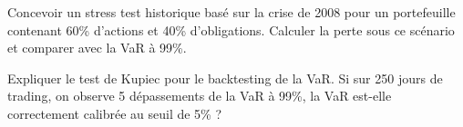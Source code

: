 \begin{exercice}
Concevoir un stress test historique bas\'e sur la crise de 2008 pour un
portefeuille contenant 60\% d'actions et 40\% d'obligations. Calculer la
perte sous ce sc\'enario et comparer avec la VaR \`a 99\%.
\end{exercice}

\begin{exercice}[Backtesting]
Expliquer le test de Kupiec pour le backtesting de la VaR. Si sur 250 jours
de trading, on observe 5 d\'epassements de la VaR \`a 99\%, la VaR est-elle
correctement calibr\'ee au seuil de 5\% ?
\end{exercice}

